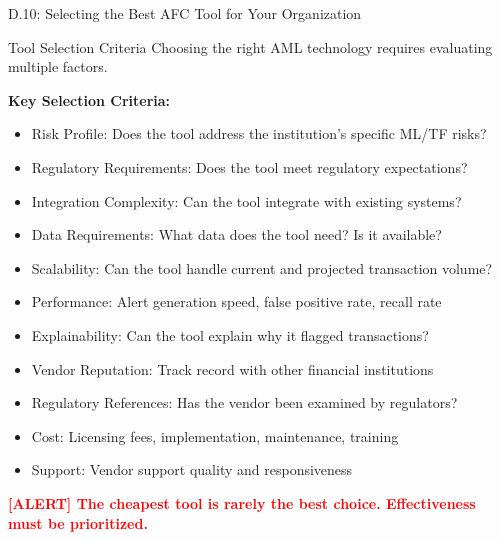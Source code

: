 \documentclass[11pt,a4paper]{beamer}
\newcommand{\redflag}[1]{\textcolor{red}{\textbf{[ALERT] #1}}}
\begin{document}
\begin{frame}{D.10: Selecting the Best AFC Tool for Your Organization}
	\begin{block}{Tool Selection Criteria}
		Choosing the right AML technology requires evaluating multiple factors.
	\end{block}
	\textbf{Key Selection Criteria:}
	\begin{itemize}
		\item Risk Profile: Does the tool address the institution's specific ML/TF risks?
		\item Regulatory Requirements: Does the tool meet regulatory expectations?
		\item Integration Complexity: Can the tool integrate with existing systems?
		\item Data Requirements: What data does the tool need? Is it available?
		\item Scalability: Can the tool handle current and projected transaction volume?
		\item Performance: Alert generation speed, false positive rate, recall rate
		\item Explainability: Can the tool explain why it flagged transactions?
		\item Vendor Reputation: Track record with other financial institutions
		\item Regulatory References: Has the vendor been examined by regulators?
		\item Cost: Licensing fees, implementation, maintenance, training
		\item Support: Vendor support quality and responsiveness
	\end{itemize}
	\redflag{The cheapest tool is rarely the best choice. Effectiveness must be prioritized.}
\end{frame}
\end{document}
